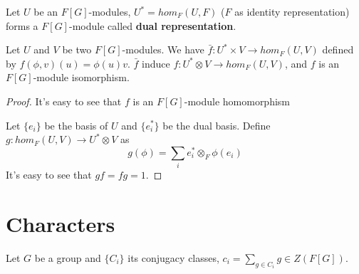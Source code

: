 \documentclass[12pt]{book}
\begin{document}
	\begin{definition}
		Let $U$ be an $F[G]$-modules, $U^*=hom_F(U,F)$ ($F$ as identity representation) forms a $F[G]$-module called {\bf dual representation}.
	\end{definition}
	
	\begin{theorem}
		Let $U$ and $V$ be two $F[G]$-modules. We have $\bar f:U^*\times V\rightarrow hom_F(U,V)$ defined by $f(\phi,v)(u)=\phi(u)v$. $\bar f$ induce $f:U^*\otimes V\rightarrow hom_F(U,V)$, and $f$ is an $F[G]$-module isomorphism.
	\end{theorem}
	\begin{proof}
		It's easy to see that $f$ is an $F[G]$-module homomorphism
		
		Let $\{e_i\}$ be the basis of $U$ and $\{e_i^*\}$ be the dual basis. Define $g:hom_F(U,V)\rightarrow U^*\otimes V$ as 
		\begin{equation}
			g(\phi)=\sum_i e_i^*\otimes_F\phi(e_i)
		\end{equation}
		It's easy to see that $gf=fg=1$.
	\end{proof}
	
	\section{Characters}
	
	Let $G$ be a group and $\{C_i\}$ its conjugacy classes, $c_i=\sum_{g\in C_i}g\in Z(F[G])$.
	
\end{document}
